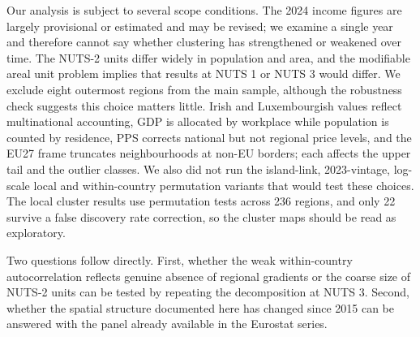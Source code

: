 \documentclass[11pt]{article}
\begin{document}
Our analysis is subject to several scope conditions. The 2024 income figures are largely provisional or estimated and may be revised; we examine a single year and therefore cannot say whether clustering has strengthened or weakened over time. The NUTS-2 units differ widely in population and area, and the modifiable areal unit problem implies that results at NUTS 1 or NUTS 3 would differ. We exclude eight outermost regions from the main sample, although the robustness check suggests this choice matters little. Irish and Luxembourgish values reflect multinational accounting, GDP is allocated by workplace while population is counted by residence, PPS corrects national but not regional price levels, and the EU27 frame truncates neighbourhoods at non-EU borders; each affects the upper tail and the outlier classes. We also did not run the island-link, 2023-vintage, log-scale local and within-country permutation variants that would test these choices. The local cluster results use permutation tests across 236 regions, and only 22 survive a false discovery rate correction, so the cluster maps should be read as exploratory.

Two questions follow directly. First, whether the weak within-country autocorrelation reflects genuine absence of regional gradients or the coarse size of NUTS-2 units can be tested by repeating the decomposition at NUTS 3. Second, whether the spatial structure documented here has changed since 2015 can be answered with the panel already available in the Eurostat series.



\end{document}
